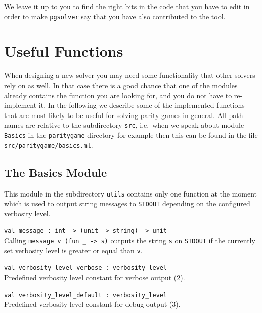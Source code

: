 We leave it up to you to find the right bits in the code that you have to edit in order to make
\texttt{pgsolver} say that you have also contributed to the tool.



\section{Useful Functions}

When designing a new solver you may need some functionality that other solvers rely on as well. In that
case there is a good chance that one of the modules already contains the function you are looking for,
and you do not have to re-implement it. In the following we describe some of the implemented functions
that are most likely to be useful for solving parity games in general. All path names are relative to
the subdirectory \texttt{src}, i.e.\ when we speak about module \texttt{Basics} in the \texttt{paritygame}
directory for example then this can be found in the file \texttt{src/paritygame/basics.ml}.

\subsection{The {\ttfamily Basics} Module}

This module in the subdirectory \texttt{utils} contains only one function at the moment which is used to
output string messages to \texttt{STDOUT} depending on the configured verbosity level.

\begin{description}
\itemsep3mm
\item \verb+val message : int -> (unit -> string) -> unit+ \ \\
Calling \verb+message v (fun _ -> s)+ outputs the string \verb+s+ on \texttt{STDOUT} if the currently
set verbosity level is greater or equal than \verb+v+.

\item \verb+val verbosity_level_verbose : verbosity_level+ \ \\
Predefined verbosity level constant for verbose output (2).

\item \verb+val verbosity_level_default : verbosity_level+ \ \\
Predefined verbosity level constant for debug output (3).
\end{description}


